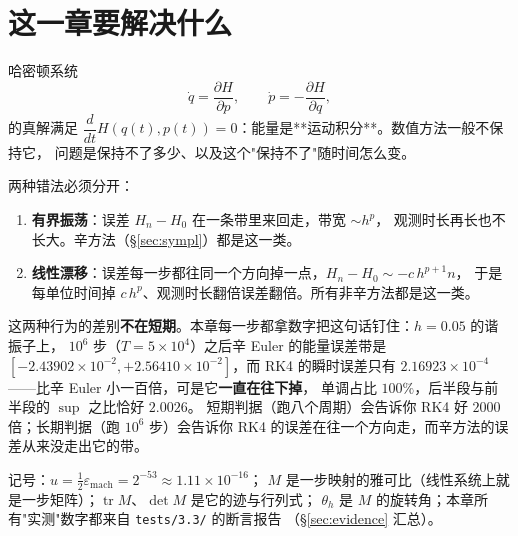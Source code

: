 

\section{这一章要解决什么}

哈密顿系统
\begin{equation}
  \dot q=\frac{\partial H}{\partial p},\qquad
  \dot p=-\frac{\partial H}{\partial q},
  \label{eq:ham}
\end{equation}
的真解满足 $\dfrac{d}{dt}H(q(t),p(t))=0$：能量是**运动积分**。数值方法一般不保持它，
问题是保持不了多少、以及这个"保持不了"随时间怎么变。

两种错法必须分开：

\begin{enumerate}
  \item \textbf{有界振荡}：误差 $H_n-H_0$ 在一条带里来回走，带宽 $\sim h^p$，
        观测时长再长也不长大。辛方法（\S\ref{sec:sympl}）都是这一类。
  \item \textbf{线性漂移}：误差每一步都往同一个方向掉一点，$H_n-H_0\sim -c\,h^{p+1}n$，
        于是每单位时间掉 $c\,h^p$、观测时长翻倍误差翻倍。所有非辛方法都是这一类。
\end{enumerate}

这两种行为的差别\textbf{不在短期}。本章每一步都拿数字把这句话钉住：$h=0.05$ 的谐振子上，
$10^6$ 步（$T=5\times10^4$）之后辛 Euler 的能量误差带是
$[-2.43902\times10^{-2},+2.56410\times10^{-2}]$，而 RK4 的瞬时误差只有
$2.16923\times10^{-4}$——比辛 Euler 小一百倍，可是它\textbf{一直在往下掉}，
单调占比 $100\%$，后半段与前半段的 $\sup$ 之比恰好 $2.0026$。
短期判据（跑八个周期）会告诉你 RK4 好 $2000$ 倍；长期判据（跑 $10^6$ 步）会告诉你
RK4 的误差在往一个方向走，而辛方法的误差从来没走出它的带。

记号：$u=\tfrac12\varepsilon_{\text{mach}}=2^{-53}\approx1.11\times10^{-16}$；
$M$ 是一步映射的雅可比（线性系统上就是一步矩阵）；$\operatorname{tr}M$、$\det M$ 是它的迹与行列式；
$\theta_h$ 是 $M$ 的旋转角；本章所有"实测"数字都来自 \texttt{tests/3.3/} 的断言报告
（\S\ref{sec:evidence} 汇总）。

